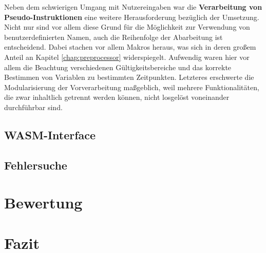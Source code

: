 Neben dem schwierigen Umgang mit Nutzereingaben war die \textbf{Verarbeitung von Pseudo-Instruktionen} eine weitere Herausforderung bezüglich der Umsetzung. Nicht nur sind vor allem diese Grund für die Möglichkeit zur Verwendung von benutzerdefinierten Namen, auch die Reihenfolge der Abarbeitung ist entscheidend. Dabei stachen vor allem Makros heraus, was sich in deren großem Anteil an Kapitel \ref{chap:preprocessor} widerspiegelt. Aufwendig waren hier vor allem die Beachtung verschiedenen Gültigkeitsbereiche und das korrekte Bestimmen von Variablen zu bestimmten Zeitpunkten. Letzteres erschwerte die Modularisierung der Vorverarbeitung maßgeblich, weil mehrere Funktionalitäten, die zwar inhaltlich getrennt werden können, nicht losgelöst voneinander durchführbar sind.

\subsection{\ac{WASM}-Interface}



\subsection{Fehlersuche}\label{sec:errors}



\section{Bewertung}


\section{Fazit}
